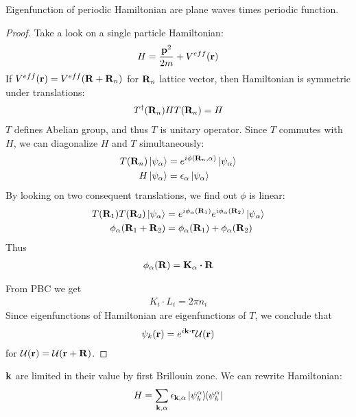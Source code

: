 \begin{theorem} \label{bloch}
	Eigenfunction of periodic Hamiltonian are plane waves times periodic function.
\begin{proof}
	Take a look on a single particle Hamiltonian:
	\begin{align}
	H = \frac{\vb{p}^2}{2m} + V^{eff} (\vb{r})
	\end{align}
	If $V^{eff}(\vb{r}) = V^{eff}(\vb{R} + \vb{R}_n)$ for $\vb{R}_n$ lattice vector, then Hamiltonian is symmetric under translations:
	\begin{align}
	T^\dagger(\vb{R}_n) H T(\vb{R}_n) = H
	\end{align}
	$T$ defines Abelian group, and thus $T$ is unitary operator. Since $T$ commutes with $H$, we can diagonalize $H$ and $T$ simultaneously:
	\begin{align}
	T(\vb{R}_n) \ket{\psi_\alpha} &= e^{i \phi(\vb{R}_n, \alpha)} \ket{\psi_\alpha}\\
	H \ket{\psi_\alpha} &= \epsilon_\alpha \ket{\psi_\alpha}\
	\end{align}
	By looking on two consequent translations, we find out $\phi$ is linear:
	\begin{align}
	T(\vb{R}_1)T(\vb{R}_2) \ket{\psi_\alpha} &= e^{i \phi_\alpha(\vb{R}_1)}e^{i \phi_\alpha(\vb{R}_2)} \ket{\psi_\alpha}\\
	\phi_\alpha(\vb{R}_1 + \vb{R}_2) &=\phi_\alpha(\vb{R}_1) + \phi_\alpha(\vb{R}_2)
	\end{align}
	Thus 
	\begin{align}
	\phi_\alpha(\vb{R}) = \vb{K}_\alpha \vdot \vb{R}
	\end{align}
	
	From PBC we get
	\begin{align}
	K_i \cdot L_i = 2\pi n_i 
	\end{align}
	Since eigenfunctions of Hamiltonian are eigenfunctions of $T$, we conclude that 
	\begin{align}
	\psi_k(\vb{r}) = e^{i \vb{k} \vdot \vb{r}} \mathcal{U}(\vb{r})
	\end{align}
	for $\mathcal{U}(\vb{r}) = \mathcal{U}(\vb{r}+\vb{R})$.
\end{proof}
\end{theorem}

$\vb{k}$ are limited in their value by first Brillouin zone. We can rewrite Hamiltonian:
\begin{align}
H = \sum_{\vb{k}, \alpha} \epsilon_{\vb{k}, \alpha} \dyad{\psi_k^\alpha}
\end{align}

